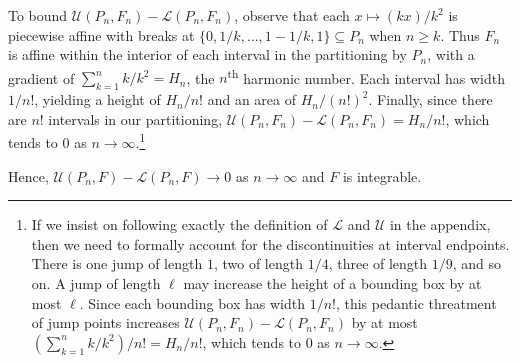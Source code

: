 \documentclass[oneside]{article}
\newcommand\bbZ{\mathbb{Z}}
\newcommand\calL{\mathcal{L}}
\newcommand\calU{\mathcal{U}}
\begin{document}
\begin{enumerate}[label=(\alph*)]
    To bound $\calU(P_n, F_n) - \calL(P_n, F_n)$, observe that each $x \mapsto (kx)/k^2$ is piecewise affine with breaks at $\{0, 1/k, \dots, 1-1/k, 1\} \subseteq P_n$ when $n \geq k$. Thus $F_n$ is affine within the interior of each interval in the partitioning by $P_n$, with a gradient of $\sum_{k=1}^n k/k^2 = H_n$, the $n$\textsuperscript{th} harmonic number. Each interval has width $1/n!$, yielding a height of $H_n/n!$ and an area of $H_n/(n!)^2$. Finally, since there are $n!$ intervals in our partitioning, $\calU(P_n, F_n) - \calL(P_n, F_n) = H_n/n!$, which tends to $0$ as $n \to \infty$.\footnote{If we insist on following exactly the definition of $\calL$ and $\calU$ in the appendix, then we need to formally account for the discontinuities at interval endpoints. There is one jump of length $1$, two of length $1/4$, three of length $1/9$, and so on. A jump of length $\ell$ may increase the height of a bounding box by at most $\ell$. Since each bounding box has width $1/n!$, this pedantic threatment of jump points increases $\calU(P_n, F_n) - \calL(P_n, F_n)$ by at most $(\sum_{k=1}^n k/k^2)/n! = H_n/n!$, which tends to $0$ as $n\to \infty$.}

    Hence, $\calU(P_n, F) - \calL(P_n, F) \to 0$ as $n\to\infty$ and $F$ is integrable.

  \end{enumerate}
\end{document}
